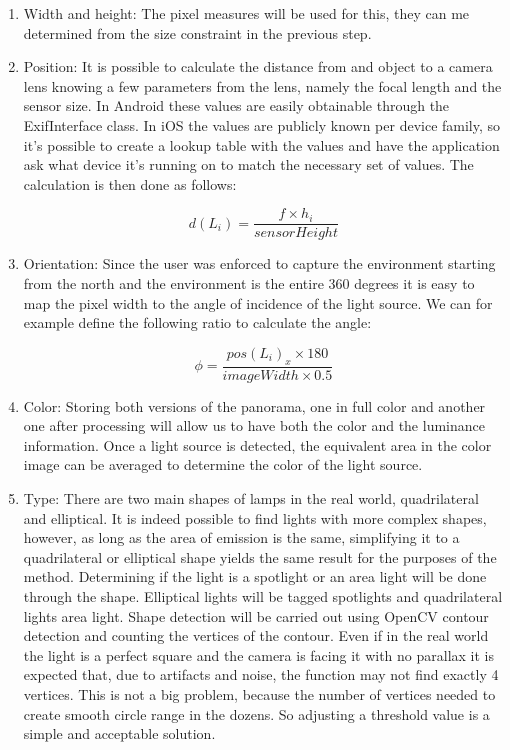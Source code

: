 \begin{enumerate}
\item Width and height: The pixel measures will be used for this, they can me determined from the size constraint in the previous step.
\item Position: It is possible to calculate the distance from and object to a camera lens knowing a few parameters from the lens, namely the focal length and the sensor size. In Android these values are easily obtainable through the ExifInterface class. In iOS the values are publicly known per device family, so it's possible to create a lookup table with the values and have the application ask what device it's running on to match the necessary set of values. The calculation is then done as follows:

\begin{equation}
    d(L_i) = \frac{ f \times h_i}{sensorHeight}
\end{equation}

\item  Orientation: Since the user was enforced to capture the environment starting from the north and the environment is the entire 360 degrees it is easy to map the pixel width to the angle of incidence of the light source. We can for example define the following ratio to calculate the angle:

\begin{equation}
    \phi = \frac{pos(L_i)_x \times 180}{imageWidth \times 0.5}
\end{equation}

\item Color: Storing both versions of the panorama, one in full color and another one after processing will allow us to have both the color and the luminance information. Once a light source is detected, the equivalent area in the color image can be averaged to determine the color of the light source.
\item Type: There are two main shapes of lamps in the real world, quadrilateral and elliptical. It is indeed possible to find lights with more complex shapes, however, as long as the area of emission is the same, simplifying it to a quadrilateral or elliptical shape yields the same result for the purposes of the method.
\newline 
Determining if the light is a spotlight or an area light will be done through the shape. Elliptical lights will be tagged spotlights and quadrilateral lights area light. Shape detection will be carried out using OpenCV contour detection and counting the vertices of the contour. Even if in the real world the light is a perfect square and the camera is facing it with no parallax it is expected that,  due to artifacts and noise, the function may not find exactly 4 vertices. This is not a big problem, because the number of vertices needed to create smooth circle range in the dozens. So adjusting a threshold value is a simple and acceptable solution.
\end{enumerate}

